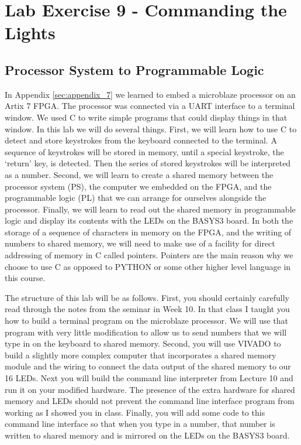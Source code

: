 \documentclass[../physical_computing.tex]{subfiles}
\begin{document}
\chapter{Lab Exercise 9 - Commanding the Lights}
\label{sec:appendix_9}

\section{Processor System to Programmable Logic}
\label{sec:ps2pl}

In Appendix \ref{sec:appendix_7} we learned to embed a microblaze processor on an Artix 7 FPGA. The
processor was connected via a UART interface to a terminal window. We used C to write simple programs
that could display things in that window. In this lab we will do several things. First, we will learn
how to use C to detect and store keystrokes from the keyboard connected to the terminal. A sequence of
keystrokes will be stored in memory, until a special keystroke, the `return' key, is detected. Then the 
series of stored keystrokes will be interpreted as a number. Second, we will learn to create a shared
memory between the processor system (PS), the computer we embedded on the FPGA, and the programmable logic
(PL) that we can arrange for ourselves alongside the processor. Finally, we will learn to read out the 
shared memory in programmable logic and display its contents with the LEDs on the BASYS3 board. In both 
the storage of a sequence of characters in memory on the FPGA, and the writing of numbers to shared 
memory, we will need to make use of a facility for direct addressing of memory in C called pointers.
Pointers are the main reason why we choose to use C as opposed to PYTHON or some other higher level
language in this course. 

The structure of this lab will be as follows. First, you should certainly carefully read through the 
notes from the seminar in Week 10. In that class I taught you how to build a terminal program on the 
microblaze processor. We will use that program with very little modification to allow us to send 
numbers that we will type in on the keyboard to shared memory. Second, you will use VIVADO to build
a slightly more complex computer that incorporates a shared memory module and the wiring to connect
the data output of the shared memory to our 16 LEDs. Next you will build the command line interpreter
from Lecture 10 and run it on your modified hardware. The presence of the extra hardware for shared 
memory and LEDs should not prevent the command line interface program from working as I showed you in 
class. Finally, you will add some code to this command line interface so that when you type in a number,
that number is written to shared memory and is mirrored on the LEDs on the BASYS3 board.
\end{document}
